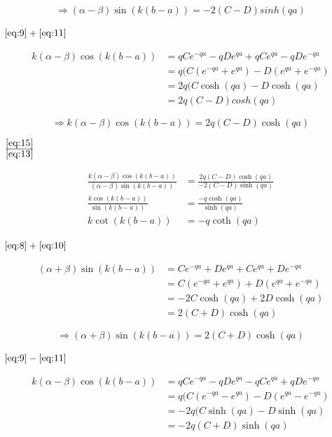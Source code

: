 \begin{equation}
  \label{eq:13}
 \Rightarrow  (\alpha-\beta)\sin(k(b-a))=-2(C-D)sinh(qa)
\end{equation}

\( \eqref{eq:9}+\eqref{eq:11}  \)

\begin{align}
  \label{eq:14}
  k(\alpha-\beta)\cos(k(b-a)) &= qCe^{-qa}-qDe^{qa}+ qCe^{qa}-qDe^{-qa}\\
&= q(C(e^{-qa}+ e^{qa})-D(e^{qa}+e^{-qa})\\
&= 2q(C\cosh(qa)-D\cosh(qa)\\
&=2q(C-D)cosh(qa)
\end{align}

\begin{equation}
  \label{eq:15}
 \Rightarrow  k(\alpha-\beta)\cos(k(b-a))=2q(C-D)\cosh(qa)
\end{equation}


\( \frac{\eqref{eq:15}}{ \eqref{eq:13} } \)

\begin{align} 
\frac{k(\alpha-\beta)\cos(k(b-a))}{(\alpha-\beta)\sin(k(b-a)) }&=  \frac{2q(C-D)\cosh(qa)}{-2(C-D)\sinh(qa) }\\
\frac{k\cos(k(b-a))}{\sin(k(b-a)) }&=  \frac{-q\cosh(qa)}{\sinh(qa) }\\
k\cot(k(b-a)) &= - q\coth(qa) \label{eq:16}
\end{align}


\( \eqref{eq:8}+\eqref{eq:10}  \)

\begin{align}
  \label{eq:17}
  (\alpha+\beta)\sin(k(b-a)) &= Ce^{-qa}+De^{qa}+ Ce^{qa}+De^{-qa}\\
&= C(e^{-qa}+ e^{qa})+D(e^{qa}+e^{-qa})\\
&=-2C\cosh(qa)+2D\cosh(qa)\\
&=2(C+D)\cosh(qa)
\end{align}

\begin{equation}
  \label{eq:18}
 \Rightarrow  (\alpha+\beta)\sin(k(b-a))=2(C+D)\cosh(qa)
\end{equation}

\( \eqref{eq:9}-\eqref{eq:11}  \)

\begin{align}
  \label{eq:19}
  k(\alpha-\beta)\cos(k(b-a)) &= qCe^{-qa}-qDe^{qa}- qCe^{qa}+qDe^{-qa}\\
&= q(C(e^{-qa}- e^{qa})-D(e^{qa}-e^{-qa})\\
&= -2q(C\sinh(qa)-D\sinh(qa)\\
&=-2q(C+D)\sinh(qa)
\end{align}


